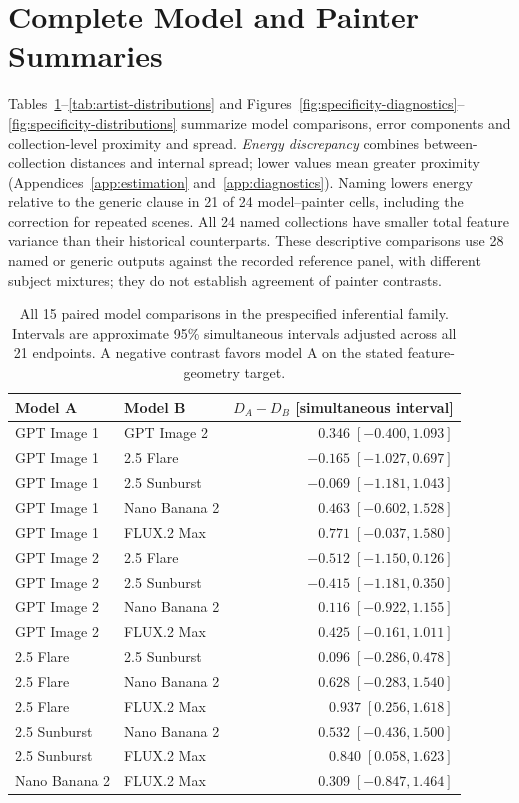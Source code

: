 \section{Complete Model and Painter Summaries}\label{app:results}
Tables~\ref{tab:all-specificity-pairs}--\ref{tab:artist-distributions} and
Figures~\ref{fig:specificity-diagnostics}--\ref{fig:specificity-distributions}
summarize model comparisons, error components and collection-level proximity
and spread.
\emph{Energy discrepancy} combines between-collection distances and internal
spread; lower values mean greater proximity (Appendices~\ref{app:estimation}
and~\ref{app:diagnostics}). Naming lowers energy relative to the generic clause in 21 of 24
model--painter cells, including the correction for repeated scenes.
All 24 named collections have smaller total feature variance than their historical
counterparts. These descriptive comparisons use 28 named or generic outputs
against the recorded reference panel, with different subject mixtures; they do
not establish agreement of painter contrasts.
\begin{table}[htbp]
\caption{All 15 paired model comparisons in the prespecified inferential family. Intervals are approximate 95\% simultaneous intervals adjusted across all 21 endpoints. A negative contrast favors model A on the stated feature-geometry target.}
\label{tab:all-specificity-pairs}
\centering\small
\begin{tabular}{llr}\toprule
Model A & Model B & $D_A-D_B$ [simultaneous interval]\\\midrule
GPT Image 1 & GPT Image 2 & $0.346\;[-0.400,1.093]$\\
GPT Image 1 & 2.5 Flare & $-0.165\;[-1.027,0.697]$\\
GPT Image 1 & 2.5 Sunburst & $-0.069\;[-1.181,1.043]$\\
GPT Image 1 & Nano Banana 2 & $0.463\;[-0.602,1.528]$\\
GPT Image 1 & FLUX.2 Max & $0.771\;[-0.037,1.580]$\\
GPT Image 2 & 2.5 Flare & $-0.512\;[-1.150,0.126]$\\
GPT Image 2 & 2.5 Sunburst & $-0.415\;[-1.181,0.350]$\\
GPT Image 2 & Nano Banana 2 & $0.116\;[-0.922,1.155]$\\
GPT Image 2 & FLUX.2 Max & $0.425\;[-0.161,1.011]$\\
2.5 Flare & 2.5 Sunburst & $0.096\;[-0.286,0.478]$\\
2.5 Flare & Nano Banana 2 & $0.628\;[-0.283,1.540]$\\
2.5 Flare & FLUX.2 Max & $0.937\;[0.256,1.618]$\\
2.5 Sunburst & Nano Banana 2 & $0.532\;[-0.436,1.500]$\\
2.5 Sunburst & FLUX.2 Max & $0.840\;[0.058,1.623]$\\
Nano Banana 2 & FLUX.2 Max & $0.309\;[-0.847,1.464]$\\
\bottomrule\end{tabular}

\end{table}

